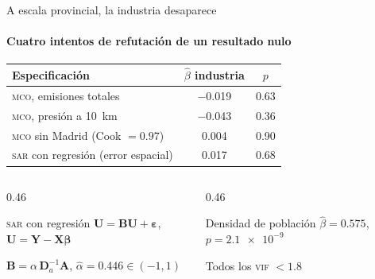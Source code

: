 \documentclass[11pt,aspectratio=169]{beamer}
\newcommand{\Adj}{\bm{A}}                    %
\begin{document}
\begin{frame}{A escala provincial, la industria desaparece}
\framesubtitle{Cuatro intentos de refutación de un resultado nulo}

\vspace{1mm}
\centering
\small
\begin{tabular}{@{}lcc@{}}
\toprule
\textbf{Especificación} & \textbf{$\hat\beta$ industria} & \textbf{$p$} \\
\midrule
\textsc{mco}, emisiones totales & \num{-0.019} & \num{0.63} \\
\textsc{mco}, presión a \SI{10}{\kilo\metre} & \num{-0.043} & \num{0.36} \\
\textsc{mco} sin Madrid (Cook $=\num{0.97}$) & \num{0.004} & \num{0.90} \\
\textsc{sar} con regresión (error espacial) & \num{0.017} & \num{0.68} \\
\bottomrule
\end{tabular}

\vspace{3mm}
\begin{columns}[T]
\begin{column}{0.46\textwidth}
\begin{block}{\textsc{sar} con regresión}
\centering
\small
$\bm{U}=\bm{B}\bm{U}+\bm{\varepsilon}$, \; $\bm{U}=\bm{Y}-\bm{X}\bm{\beta}$

\vspace{1mm}
$\bm{B}=\alpha\,\bm{D}_a^{-1}\Adj$, \;
$\hat\alpha=\num{0.446}\in(-1,1)$
\end{block}
\end{column}
\begin{column}{0.46\textwidth}
\begin{block}{Densidad de población}
\centering
$\hat\beta = \num{0.575}$, \quad $p = \num{2.1e-9}$

\vspace{1mm}
{\footnotesize Todos los \textsc{vif} $< \num{1.8}$}
\end{block}
\end{column}
\end{columns}

\vspace{3mm}

\end{frame}
\end{document}

